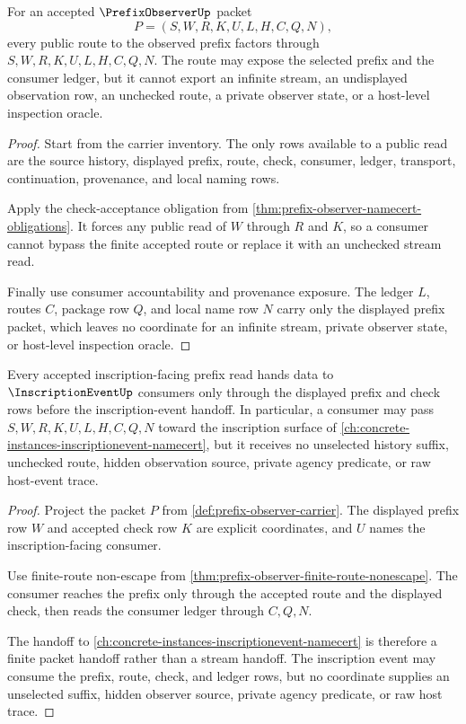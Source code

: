 \begin{theorem}
\label{thm:prefix-observer-finite-route-nonescape}
For an accepted $\PrefixObserverUp$ packet
$$
P=(S,W,R,K,U,L,H,C,Q,N),
$$
every public route to the observed prefix factors through $S,W,R,K,U,L,H,C,Q,N$.
The route may expose the selected prefix and the consumer ledger, but it
cannot export an infinite stream, an undisplayed observation row, an unchecked
route, a private observer state, or a host-level inspection oracle.
\end{theorem}
\begin{proof}
Start from the carrier inventory. The only rows available to a public read
are the source history, displayed prefix, route, check, consumer, ledger,
transport, continuation, provenance, and local naming rows.

Apply the check-acceptance obligation from
\autoref{thm:prefix-observer-namecert-obligations}. It forces any public read
of $W$ through $R$ and $K$, so a consumer cannot bypass the finite accepted
route or replace it with an unchecked stream read.

Finally use consumer accountability and provenance exposure. The ledger $L$,
routes $C$, package row $Q$, and local name row $N$ carry only the displayed
prefix packet, which leaves no coordinate for an infinite stream, private
observer state, or host-level inspection oracle.
\end{proof}

\begin{theorem}
\label{thm:prefix-observer-inscription-handoff}
Every accepted inscription-facing prefix read hands data to
$\InscriptionEventUp$ consumers only through the displayed prefix and check
rows before the inscription-event handoff. In particular, a consumer may pass
$S,W,R,K,U,L,H,C,Q,N$ toward the inscription surface of
\autoref{ch:concrete-instances-inscriptionevent-namecert}, but it receives no
unselected history suffix, unchecked route, hidden observation source, private
agency predicate, or raw host-event trace.
\end{theorem}
\begin{proof}
Project the packet $P$ from \autoref{def:prefix-observer-carrier}. The
displayed prefix row $W$ and accepted check row $K$ are explicit coordinates,
and $U$ names the inscription-facing consumer.

Use finite-route non-escape from
\autoref{thm:prefix-observer-finite-route-nonescape}. The consumer reaches the
prefix only through the accepted route and the displayed check, then reads the
consumer ledger through $C,Q,N$.

The handoff to \autoref{ch:concrete-instances-inscriptionevent-namecert} is
therefore a finite packet handoff rather than a stream handoff. The inscription
event may consume the prefix, route, check, and ledger rows, but no coordinate
supplies an unselected suffix, hidden observer source, private agency
predicate, or raw host trace.
\end{proof}

